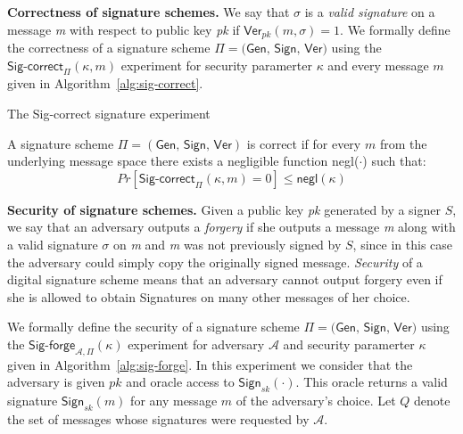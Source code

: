 \noindent
\textbf{Correctness of signature schemes.}
We say that $\sigma$ is a \emph{valid signature} on a message \emph{m} with respect to public key \emph{pk} if $\textsf{Ver}_{pk}(m,\sigma) = 1$. We formally define the correctness of a signature scheme $\Pi = \textsf{(Gen, Sign, Ver)}$ using the $\textsf{Sig-correct}_{\Pi}(\kappa, m)$ experiment for security paramerter $\kappa$ and every message $m$ given in Algorithm~\ref{alg:sig-correct}.

\begin{algorithm}[h]
		\caption{\label{alg:sig-correct} The \textsf{Sig-correct} signature experiment}
		\begin{algorithmic}[1]
					\State{}
				\EndIf
				\State{}
			\EndFunction
		\end{algorithmic}
\end{algorithm}

\begin{defn}
	\label{def:singature_correctness}
	A signature scheme $\Pi = (\textsf{Gen, Sign, Ver})$ is correct if for every $m$ from the underlying message space there exists a negligible function \textsf{negl($\cdot$)} such that:
	\begin{equation*}
		Pr[\textsf{Sig-correct}_{\Pi}(\kappa, m) = 0] \leq \textsf{negl}(\kappa)
	\end{equation*}
\end{defn}

\noindent
\textbf{Security of signature schemes.}
Given a public key \emph{pk} generated by a signer $S$, we say that an adversary outputs a \emph{forgery} if she outputs a message \emph{m} along with a valid signature $\sigma$ on \emph{m} and \emph{m} was not previously signed by $S$, since in this case the adversary could simply copy the originally signed message. \emph{Security} of a digital signature scheme means that an adversary cannot output forgery even if she is allowed to obtain Signatures on many other messages of her choice.

We formally define the security of a signature scheme $\Pi = \textsf{(Gen, Sign, Ver)}$ using the $\textsf{Sig-forge}_{\mathcal{A}, \Pi}(\kappa)$ experiment for adversary $\mathcal{A}$ and security paramerter $\kappa$ given in Algorithm~\ref{alg:sig-forge}. 
In this experiment we consider that the adversary is given $pk$ and oracle access to $\textsf{Sign}_{sk}(\cdot)$. This oracle returns a valid signature $\textsf{Sign}_{sk}(m)$ for any message $m$ of the adversary's choice. Let $Q$ denote the set of messages whose signatures were requested by $\mathcal{A}$.

